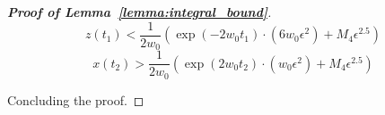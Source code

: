 \begin{proof}[\textbf{Proof of Lemma~\ref{lemma:integral_bound}}]
\begin{equation}
    z(t_1)  < \frac{1}{2w_0}\left(\exp(-2w_0t_1) \cdot (6 w_0 \epsilon^2) + M_4 \epsilon^{2.5} \right)
\end{equation}
\begin{equation}
    x(t_2)  > \frac{1}{2w_0}\left(\exp(2w_0t_2) \cdot (w_0\epsilon^2) + M_4 \epsilon^{2.5} \right)
\end{equation}

Concluding the proof.
\end{proof}